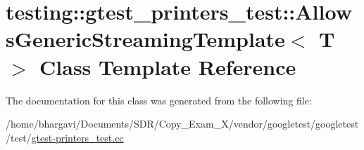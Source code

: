\hypertarget{classtesting_1_1gtest__printers__test_1_1_allows_generic_streaming_template}{}\section{testing\+:\+:gtest\+\_\+printers\+\_\+test\+:\+:Allows\+Generic\+Streaming\+Template$<$ T $>$ Class Template Reference}
\label{classtesting_1_1gtest__printers__test_1_1_allows_generic_streaming_template}


The documentation for this class was generated from the following file\+:\begin{DoxyCompactItemize}
\item 
/home/bhargavi/\+Documents/\+S\+D\+R/\+Copy\+\_\+\+Exam\+\_\+X/vendor/googletest/googletest/test/\hyperlink{gtest-printers__test_8cc}{gtest-\/printers\+\_\+test.\+cc}\end{DoxyCompactItemize}
